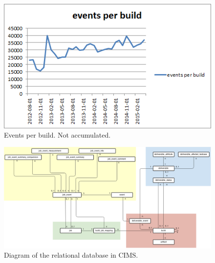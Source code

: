 \begin{figure}[h!]
\centering
\includegraphics[]{figure/events_per_build.png}
\caption{Events per build. Not accumulated.}
\label{fig:events_per_build}
\end{figure}


\begin{figure}[h!]
\centering
\includegraphics[scale=0.5, angle=90]{figure/sql.png}
\caption{Diagram of the relational database in CIMS.}
\label{fig:sql}
\end{figure}